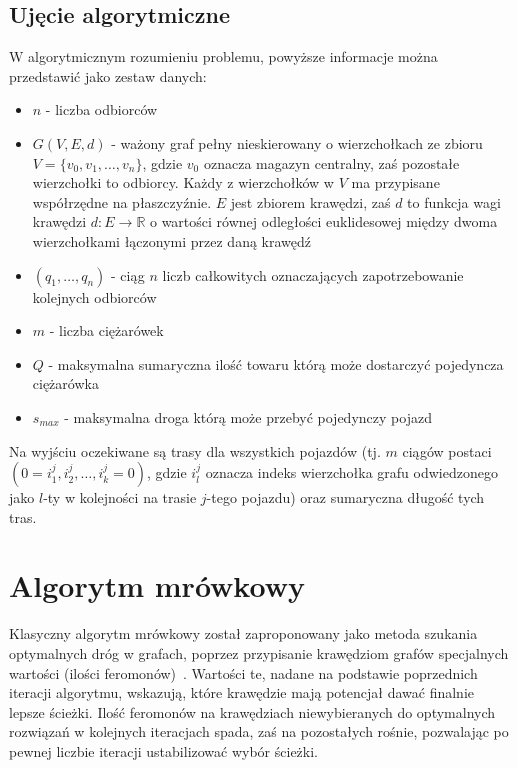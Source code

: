 \documentclass[10pt]{article}
\begin{document}
\subsection{Ujęcie algorytmiczne}
W algorytmicznym rozumieniu problemu, powyższe informacje można przedstawić jako zestaw danych:
\begin{itemize}
    \item $n$ - liczba odbiorców
    \item $G(V,E,d)$ - ważony graf pełny nieskierowany o wierzchołkach ze zbioru $V = \{v_0,v_1,\dots,v_n\}$, gdzie $v_0$ oznacza magazyn centralny, zaś pozostałe wierzchołki to odbiorcy. Każdy z wierzchołków w $V$ ma przypisane współrzędne na płaszczyźnie. $E$ jest zbiorem krawędzi, zaś $d$ to funkcja wagi krawędzi $d: E \rightarrow \mathbb{R}$ o wartości równej odległości euklidesowej między dwoma wierzchołkami łączonymi przez daną krawędź
    \item $(q_1,\ldots,q_n)$ - ciąg $n$ liczb całkowitych oznaczających zapotrzebowanie kolejnych odbiorców
    \item $m$ - liczba ciężarówek
    \item $Q$ - maksymalna sumaryczna ilość towaru którą może dostarczyć pojedyncza ciężarówka
    \item $s_{max}$ - maksymalna droga którą może przebyć pojedynczy pojazd
\end{itemize}
Na wyjściu oczekiwane są trasy dla wszystkich pojazdów (tj. $m$ ciągów postaci $(0=i_1^{j}, i_2^{j}, \dots, i_k^{j}=0)$, gdzie $i_l^{j}$ oznacza indeks wierzchołka grafu odwiedzonego jako $l$-ty w kolejności na trasie $j$-tego pojazdu) oraz sumaryczna długość tych tras.

\section{Algorytm mrówkowy}
Klasyczny algorytm mrówkowy został zaproponowany jako metoda szukania optymalnych dróg w grafach, poprzez przypisanie krawędziom grafów specjalnych wartości (ilości feromonów)~\cite{Dorigo1996}\cite{Dorigo1999}. Wartości te, nadane na podstawie poprzednich iteracji algorytmu, wskazują, które krawędzie mają potencjał dawać finalnie lepsze ścieżki. Ilość feromonów na krawędziach niewybieranych do optymalnych rozwiązań w kolejnych iteracjach spada, zaś na pozostałych rośnie, pozwalając po pewnej liczbie iteracji ustabilizować wybór ścieżki.
\end{document}
